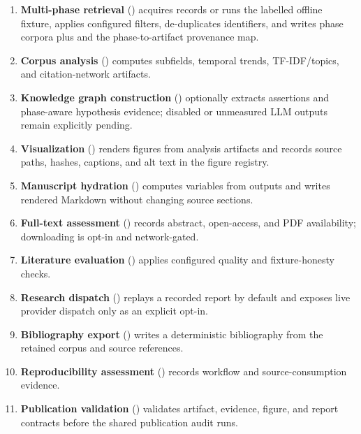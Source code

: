 \documentclass[
]{article}
\providecommand{\tightlist}{%
  \setlength{\itemsep}{0pt}\setlength{\parskip}{0pt}}
\begin{document}
\begin{enumerate}
\def\labelenumi{\arabic{enumi}.}
\tightlist
\item
  \textbf{Multi-phase retrieval} ()
  acquires records or runs the labelled offline fixture, applies
  configured filters, de-duplicates identifiers, and writes phase
  corpora plus  and the
   phase-to-artifact provenance
  map.
\item
  \textbf{Corpus analysis} ()
  computes subfields, temporal trends, TF-IDF/topics, and
  citation-network artifacts.
\item
  \textbf{Knowledge graph construction}
  () optionally extracts
  assertions and phase-aware hypothesis evidence; disabled or unmeasured
  LLM outputs remain explicitly pending.
\item
  \textbf{Visualization} () renders
  figures from analysis artifacts and records source paths, hashes,
  captions, and alt text in the figure registry.
\item
  \textbf{Manuscript hydration} ()
  computes variables from outputs and writes rendered Markdown without
  changing source sections.
\item
  \textbf{Full-text assessment} ()
  records abstract, open-access, and PDF availability; downloading is
  opt-in and network-gated.
\item
  \textbf{Literature evaluation}
  () applies configured quality
  and fixture-honesty checks.
\item
  \textbf{Research dispatch} ()
  replays a recorded report by default and exposes live provider
  dispatch only as an explicit opt-in.
\item
  \textbf{Bibliography export} ()
  writes a deterministic bibliography from the retained corpus and
  source references.
\item
  \textbf{Reproducibility assessment}
  () records workflow and
  source-consumption evidence.
\item
  \textbf{Publication validation} ()
  validates artifact, evidence, figure, and report contracts before the
  shared publication audit runs.
\end{enumerate}
\end{document}
